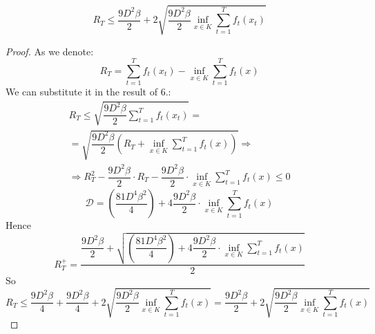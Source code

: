 \documentclass[12pt]{report}
\begin{document}
\begin{enumerate}
                \[
                    R_T \leq \dfrac{9D^2\beta}{2} + 2\sqrt{\displaystyle \dfrac{9D^2\beta}{2} \inf\limits_{x \in K}\sum\limits_{t=1}^T f_t(x_t)}  
                \]
                \begin{proof}
                    As we denote:
                    \[
                        R_T = \sum\limits_{t=1}^T f_t(x_t) - \inf\limits_{x\in K} \sum\limits_{t=1}^T f_t(x)  
                    \]
                    We can substitute it in the result of 6.:
                    \[
                        \begin{array}{c}
                            \displaystyle R_T \leq \sqrt{\displaystyle \dfrac{9D^2\beta}{2} \sum\limits_{t=1}^T f_t(x_t)}  = \\[1cm]
                            \displaystyle = \sqrt{\dfrac{9D^2\beta}{2} \left(R_T + \inf\limits_{x\in K} \sum\limits_{t=1}^T f_t(x)\right)} \Longrightarrow \\[1cm]
                            \displaystyle \Rightarrow R^2_T - \dfrac{9D^2\beta}{2}\cdot R_T - \dfrac{9D^2\beta}{2} \cdot \inf\limits_{x\in K} \sum\limits_{t=1}^T f_t(x) \leq 0
                        \end{array}
                    \]
                    \[
                        \mathcal{D} = \left(\dfrac{81D^4\beta^2}{4}\right) + 4 \dfrac{9D^2\beta}{2} \cdot \inf\limits_{x\in K} \sum\limits_{t=1}^T f_t(x)  
                    \]
                    Hence 
                    \[
                        R_T^+ = \dfrac{\dfrac{9D^2\beta}{2} + \sqrt{\left(\dfrac{81D^4\beta^2}{4}\right) + 4 \dfrac{9D^2\beta}{2} \cdot \inf\limits_{x\in K} \sum\limits_{t=1}^T f_t(x)}}{2}
                    \]
                    So 
                    \[
                        R_T \leq \dfrac{9D^2\beta}{4} + \dfrac{9D^2\beta}{4} + 2\sqrt{\dfrac{9D^2\beta}{2} \inf\limits_{x\in K} \sum\limits_{t=1}^T f_t(x)} = \dfrac{9D^2\beta}{2} + 2\sqrt{\dfrac{9D^2\beta}{2} \inf\limits_{x\in K} \sum\limits_{t=1}^T f_t(x)}
                    \]
                \end{proof}



\end{enumerate}
\end{document}
